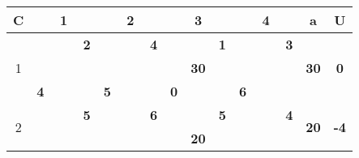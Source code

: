 \documentclass[a4paper, 12pt]{article}
\begin{document}
\begin{table}[H]
  \centering
    \begin{tabular}{|c|cccc|cccc|cccc|cccc|rr|}
    \hline
    C     & \multicolumn{4}{c|}{1}        & \multicolumn{4}{c|}{2}        & \multicolumn{4}{c|}{3}        & \multicolumn{4}{c|}{4}        & \multicolumn{1}{c|}{a} & \multicolumn{1}{c|}{U} \bigstrut\\
    \hline
    \multirow{4}[6]{*}{1} &       &       & \multicolumn{1}{r|}{} & \textbf{2} &       &       & \multicolumn{1}{r|}{} & \textbf{4} &       &       & \multicolumn{1}{r|}{} & \cellcolor[rgb]{ 1,  .753,  0}\textbf{1} &       &       & \multicolumn{1}{r|}{} & \textbf{3} & \multicolumn{1}{c|}{\multirow{4}[6]{*}{\textbf{30}}} & \multicolumn{1}{c|}{\multirow{4}[6]{*}{\textbf{0}}} \bigstrut\\
\cline{5-5}\cline{9-9}\cline{13-13}\cline{17-17}          &       & \multicolumn{2}{c}{\multirow{2}[2]{*}{}} &       &       & \multicolumn{2}{c}{\multirow{2}[2]{*}{}} &       &       & \multicolumn{2}{c}{\multirow{2}[2]{*}{\textbf{30}}} &       &       & \multicolumn{2}{c}{\multirow{2}[2]{*}{}} &       & \multicolumn{1}{c|}{} &  \bigstrut[t]\\
          &       & \multicolumn{2}{c}{} &       &       & \multicolumn{2}{c}{} &       &       & \multicolumn{2}{c}{} &       &       & \multicolumn{2}{c}{} &       & \multicolumn{1}{c|}{} &  \bigstrut[b]\\
\cline{2-2}\cline{6-6}\cline{10-10}\cline{14-14}          & \multicolumn{1}{c|}{\textbf{4}} & \multicolumn{2}{c}{} &       & \multicolumn{1}{c|}{\textbf{5}} & \multicolumn{2}{c}{} &       & \multicolumn{1}{c|}{\textbf{0}} & \multicolumn{2}{c}{} &       & \multicolumn{1}{c|}{\textbf{6}} & \multicolumn{2}{c}{} &       & \multicolumn{1}{c|}{} &  \bigstrut\\
    \hline
    \multirow{4}[6]{*}{2} &       &       & \multicolumn{1}{r|}{} & \textbf{5} &       &       & \multicolumn{1}{r|}{} & \textbf{6} &       &       & \multicolumn{1}{r|}{} & \cellcolor[rgb]{ 1,  .753,  0}\textbf{5} &       &       & \multicolumn{1}{r|}{} & \textbf{4} & \multicolumn{1}{c|}{\multirow{4}[6]{*}{\textbf{20}}} & \multicolumn{1}{c|}{\multirow{4}[6]{*}{\textbf{-4}}} \bigstrut\\
\cline{5-5}\cline{9-9}\cline{13-13}\cline{17-17}          &       & \multicolumn{2}{c}{\multirow{2}[2]{*}{}} &       &       & \multicolumn{2}{c}{\multirow{2}[2]{*}{}} &       &       & \multicolumn{2}{c}{\multirow{2}[2]{*}{\textbf{20}}} & \multirow{3}[4]{*}{} &       & \multicolumn{2}{c}{\multirow{2}[2]{*}{}} &       & \multicolumn{1}{c|}{} &  \bigstrut[t]\\

\end{tabular}
\end{table}
\end{document}
